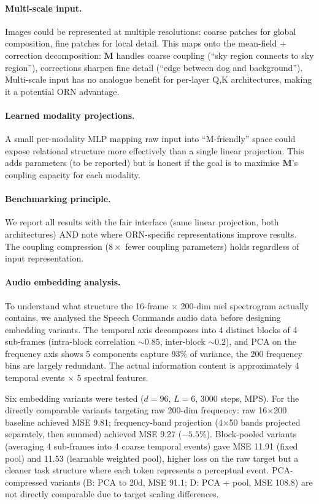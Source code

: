 \documentclass[11pt, a4paper]{article}
\newcommand{\M}{\mathbf{M}}
\theoremstyle{plain}
\theoremstyle{remark}
\begin{document}
\paragraph{Multi-scale input.}
Images could be represented at multiple resolutions: coarse patches for global composition, fine patches for local detail.
This maps onto the mean-field + correction decomposition: $\M$ handles coarse coupling (``sky region connects to sky region''), corrections sharpen fine detail (``edge between dog and background'').
Multi-scale input has no analogue benefit for per-layer Q,K architectures, making it a potential ORN advantage.

\paragraph{Learned modality projections.}
A small per-modality MLP mapping raw input into ``M-friendly'' space could expose relational structure more effectively than a single linear projection.
This adds parameters (to be reported) but is honest if the goal is to maximise $\M$'s coupling capacity for each modality.

\paragraph{Benchmarking principle.}
We report all results with the fair interface (same linear projection, both architectures) AND note where ORN-specific representations improve results.
The coupling compression ($8\times$ fewer coupling parameters) holds regardless of input representation.

\paragraph{Audio embedding analysis.}
To understand what structure the 16-frame $\times$ 200-dim mel spectrogram actually contains, we analysed the Speech Commands audio data before designing embedding variants.
The temporal axis decomposes into 4 distinct blocks of 4 sub-frames (intra-block correlation ${\sim}0.85$, inter-block ${\sim}0.2$), and PCA on the frequency axis shows 5 components capture 93\% of variance, the 200 frequency bins are largely redundant.
The actual information content is approximately 4 temporal events $\times$ 5 spectral features.

Six embedding variants were tested ($d{=}96$, $L{=}6$, 3000 steps, MPS).
For the directly comparable variants targeting raw 200-dim frequency:
raw 16$\times$200 baseline achieved MSE 9.81;
frequency-band projection (4$\times$50 bands projected separately, then summed) achieved MSE 9.27 ($-5.5\%$).
Block-pooled variants (averaging 4 sub-frames into 4 coarse temporal events) gave MSE 11.91 (fixed pool) and 11.53 (learnable weighted pool), higher loss on the raw target but a cleaner task structure where each token represents a perceptual event.
PCA-compressed variants (B: PCA to 20d, MSE 91.1; D: PCA + pool, MSE 108.8) are not directly comparable due to target scaling differences.
\end{document}

